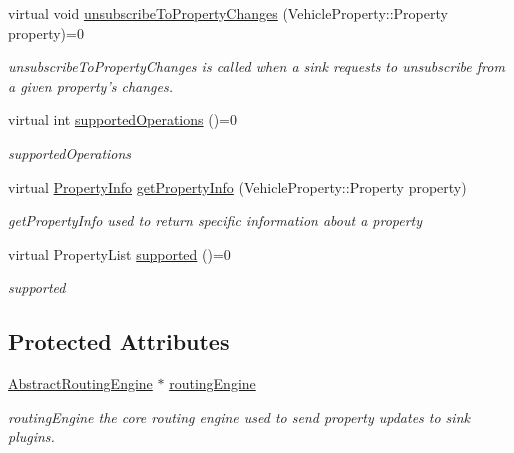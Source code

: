 \begin{DoxyCompactItemize}
virtual void \hyperlink{classAbstractSource_a584372310f191b1b9067a634b7366023}{unsubscribe\-To\-Property\-Changes} (Vehicle\-Property\-::\-Property property)=0
\begin{DoxyCompactList}\small\item\em unsubscribe\-To\-Property\-Changes is called when a sink requests to unsubscribe from a given property's changes. \end{DoxyCompactList}\item 
virtual int \hyperlink{classAbstractSource_a317861675652372a72fc01c075036b51}{supported\-Operations} ()=0
\begin{DoxyCompactList}\small\item\em supported\-Operations \end{DoxyCompactList}\item 
virtual \hyperlink{classPropertyInfo}{Property\-Info} \hyperlink{classAbstractSource_a5818ef06a4610d4969c6e1ed6a0c6242}{get\-Property\-Info} (Vehicle\-Property\-::\-Property property)
\begin{DoxyCompactList}\small\item\em get\-Property\-Info used to return specific information about a property \end{DoxyCompactList}\item 
virtual Property\-List \hyperlink{classAbstractSource_ad8330cbbac84dc24851eb50ff7243460}{supported} ()=0
\begin{DoxyCompactList}\small\item\em supported \end{DoxyCompactList}\end{DoxyCompactItemize}
\subsection*{Protected Attributes}
\begin{DoxyCompactItemize}
\item 
\hyperlink{classAbstractRoutingEngine}{Abstract\-Routing\-Engine} $\ast$ \hyperlink{classAbstractSource_aabbce93fea123c54be55a007c928a6f1}{routing\-Engine}
\begin{DoxyCompactList}\small\item\em routing\-Engine the core routing engine used to send property updates to sink plugins. \end{DoxyCompactList}\end{DoxyCompactItemize}


